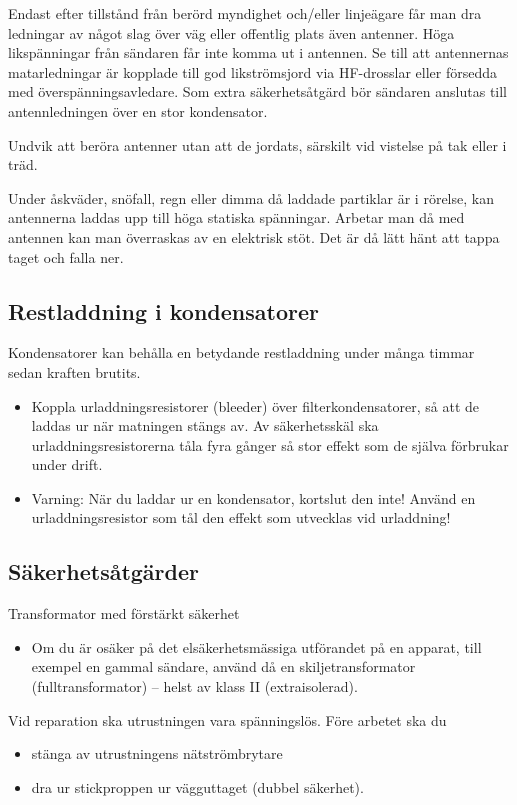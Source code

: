 Endast efter tillstånd från berörd myndighet och/eller linjeägare får
man dra ledningar av något slag över väg eller offentlig plats även antenner.
Höga likspänningar från sändaren får inte komma ut i antennen.
Se till att antennernas matarledningar är kopplade till god likströmsjord
via HF-drosslar eller försedda med överspänningsavledare.
Som extra säkerhetsåtgärd bör sändaren anslutas till antennledningen över en
stor kondensator.

Undvik att beröra antenner utan att de jordats, särskilt vid vistelse
på tak eller i träd.

Under åskväder, snöfall, regn eller dimma då laddade partiklar är i
rörelse, kan antennerna laddas upp till höga statiska spänningar.
Arbetar man då med antennen kan man överraskas av en elektrisk stöt.
Det är då lätt hänt att tappa taget och falla ner.

\subsection{Restladdning i kondensatorer}

Kondensatorer kan behålla en betydande restladdning under många timmar
sedan kraften brutits.
\begin{itemize}
\item Koppla urladdningsresistorer (bleeder) över filterkondensatorer,
  så att de laddas ur när matningen stängs av.
  Av säkerhetsskäl ska urladdningsresistorerna tåla fyra gånger så stor effekt
  som de själva förbrukar under drift.
\item Varning: När du laddar ur en kondensator, kortslut den inte!
  Använd en urladdningsresistor som tål den effekt som utvecklas vid urladdning!
\end{itemize}

\subsection{Säkerhetsåtgärder}

Transformator med förstärkt säkerhet
\begin{itemize}
\item Om du är osäker på det elsäkerhetsmässiga utförandet på en
  apparat, till exempel en gammal sändare, använd då en skiljetransformator
  (fulltransformator) -- helst av klass II (extraisolerad).
\end{itemize}

Vid reparation ska utrustningen vara spänningslös.
Före arbetet ska du
\begin{itemize}
  \item stänga av utrustningens nätströmbrytare
  \item dra ur stickproppen ur vägguttaget (dubbel säkerhet).
\end{itemize}

